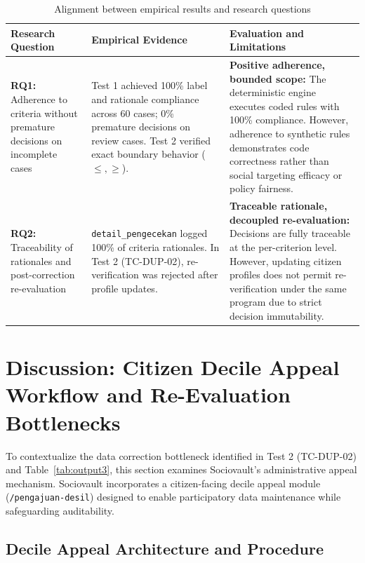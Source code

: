 \documentclass[runningheads]{llncs}
\begin{document}
\begin{table}[htbp]
\caption{Alignment between empirical results and research questions}
\label{tab:output4}
\centering
\small
\renewcommand{\arraystretch}{1.2}
\begin{tabular}{p{2.8cm}p{3.8cm}p{5.0cm}}
\hline
\textbf{Research Question} & \textbf{Empirical Evidence} & \textbf{Evaluation and Limitations} \\
\hline
\textbf{RQ1:} Adherence to criteria without premature decisions on incomplete cases & Test 1 achieved 100\% label and rationale compliance across 60 cases; 0\% premature decisions on review cases. Test 2 verified exact boundary behavior ($\le, \ge$). & \textbf{Positive adherence, bounded scope:} The deterministic engine executes coded rules with 100\% compliance. However, adherence to synthetic rules demonstrates code correctness rather than social targeting efficacy or policy fairness. \\
\hline
\textbf{RQ2:} Traceability of rationales and post-correction re-evaluation & \texttt{detail\_pengecekan} logged 100\% of criteria rationales. In Test 2 (TC-DUP-02), re-verification was rejected after profile updates. & \textbf{Traceable rationale, decoupled re-evaluation:} Decisions are fully traceable at the per-criterion level. However, updating citizen profiles does not permit re-verification under the same program due to strict decision immutability. \\
\hline
\end{tabular}
\end{table}

\section{Discussion: Citizen Decile Appeal Workflow and Re-Evaluation Bottlenecks}
\label{sec:decile_appeal_workflow}

To contextualize the data correction bottleneck identified in Test 2 (TC-DUP-02) and Table~\ref{tab:output3}, this section examines Sociovault's administrative appeal mechanism. Sociovault incorporates a citizen-facing decile appeal module (\nolinkurl{/pengajuan-desil}) designed to enable participatory data maintenance while safeguarding auditability.

\subsection{Decile Appeal Architecture and Procedure}
\end{document}
